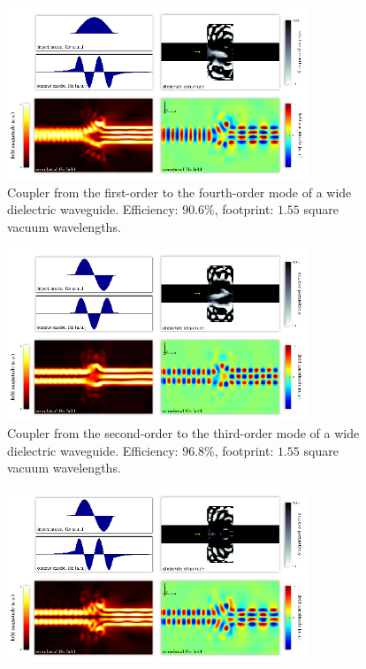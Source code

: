 \documentclass[letterpaper,10pt]{article}
\begin{document}
\begin{appendix}
\begin{figure}[h!]
{        }
\end{figure}
\begin{figure}[h!]
    \centering
    \includegraphics[width=0.8\textwidth]{8}
    \caption{
        Coupler from the first-order to the fourth-order mode 
            of a wide dielectric waveguide.
        Efficiency: $90.6\%$,
        footprint: $1.55$ square vacuum wavelengths.
        }
\end{figure}
\begin{figure}[h!]
    \centering
    \includegraphics[width=0.8\textwidth]{9}
    \caption{
        Coupler from the second-order to the third-order mode 
            of a wide dielectric waveguide.
        Efficiency: $96.8\%$,
        footprint: $1.55$ square vacuum wavelengths.
        }
\end{figure}
\begin{figure}[h!]
    \centering
    \includegraphics[width=0.8\textwidth]{10}

\end{figure}
\end{appendix}
\end{document}
